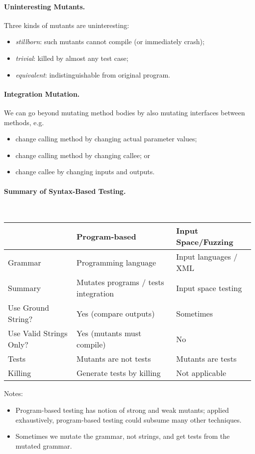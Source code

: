 \documentclass[11pt]{article}
\begin{document}
\paragraph{Uninteresting Mutants.} Three kinds of mutants are uninteresting:
\begin{itemize}[noitemsep]
\item \emph{stillborn}: such mutants cannot compile (or immediately crash);
\item \emph{trivial}: killed by almost any test case;
\item \emph{equivalent}: indistinguishable from original program.
\end{itemize}

\paragraph{Integration Mutation.} We can go beyond mutating method bodies
by also mutating interfaces between methods, e.g.
\begin{itemize}[noitemsep]
\item change calling method by changing actual parameter values;
\item change calling method by changing callee; or
\item change callee by changing inputs and outputs.
\end{itemize}

\paragraph{Summary of Syntax-Based Testing.}~\\

\begin{tabular}{l|ll}
& Program-based & Input Space/Fuzzing \\ \hline
Grammar & Programming language & Input languages / XML \\
Summary & Mutates programs / tests integration & Input space testing \\
Use Ground String? & Yes (compare outputs) & Sometimes \\
Use Valid Strings Only? & Yes (mutants must compile) & No \\
Tests & Mutants are not tests & Mutants are tests \\
Killing & Generate tests by killing & Not applicable \\
\end{tabular}

Notes: 
\begin{itemize}[noitemsep]
\item Program-based testing has notion of strong and weak mutants; applied
exhaustively, program-based testing could subsume many other techniques.
\item Sometimes we mutate the grammar, not strings, and get tests from the
mutated grammar.
\end{itemize}
\end{document}
